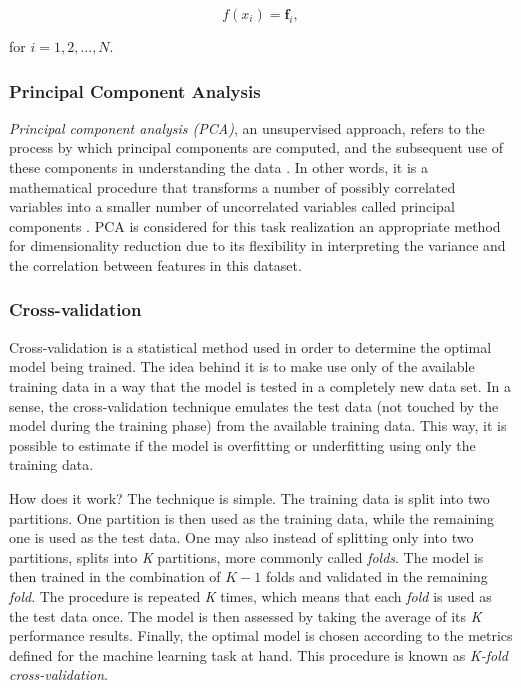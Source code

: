 \documentclass{article}
\begin{document}
\begin{equation}
    f(x_{i}) = \mathbf{f}_i, \label{eq:k-means}
\end{equation}

\noindent
for $i=1, 2, ...,N$.

\subsubsection{Principal Component Analysis}
\textit{Principal component analysis (PCA)}, an unsupervised approach, refers to the process by which principal components are computed, and the subsequent use of these components in understanding the data \parencite[see][Section 10.2]{james2013introduction}. In other words, it is a mathematical procedure that transforms a number of possibly correlated variables into a smaller number of uncorrelated variables called principal components \parencite{ncsu}. PCA is considered for this task realization an appropriate method for dimensionality reduction due to its flexibility in interpreting the variance and the correlation between features in this dataset.

\subsubsection{Cross-validation}

Cross-validation is a statistical method used in order to determine the optimal model being trained. The idea behind it is to make use only of the available training data in a way that the model is tested in a completely new data set. In a sense, the cross-validation technique emulates the test data (not touched by the model during the training phase) from the available training data. This way, it is possible to estimate if the model is overfitting or underfitting using only the training data.

How does it work? The technique is simple. The training data is split into two partitions. One partition is then used as the training data, while the remaining one is used as the test data. One may also instead of splitting only into two partitions, splits into \textit{K} partitions, more commonly called \textit{folds}. The model is then trained in the combination of $K - 1$ folds and validated in the remaining \textit{fold}. The procedure is repeated \textit{K} times, which means that each \textit{fold} is used as the test data once. The model is then assessed by taking the average of its \textit{K} performance results. Finally, the optimal model is chosen according to the metrics defined for the machine learning task at hand. This procedure is known as \textit{K-fold cross-validation}. 
\end{document}
